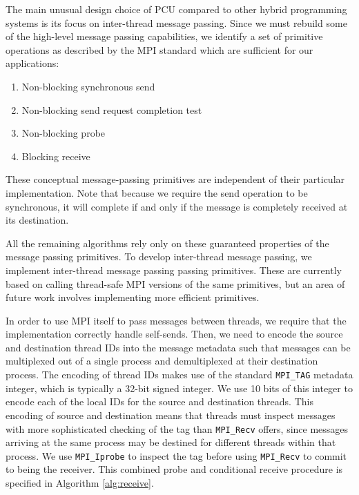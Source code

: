 The main unusual design choice of PCU compared to
other hybrid programming systems is
its focus on inter-thread message passing.
Since we must rebuild some of the high-level message
passing capabilities, we identify a set of primitive
operations as described by the MPI standard \cite{gropp1996mpi}
which are sufficient for our applications:

\begin{enumerate}
\item Non-blocking synchronous send
\item Non-blocking send request completion test
\item Non-blocking probe
\item Blocking receive
\end{enumerate}

These conceptual message-passing primitives are independent
of their particular implementation.
Note that because we require the send operation to be synchronous,
it will complete if and only if the message is completely received at its
destination.

All the remaining algorithms rely only on these guaranteed properties
of the message passing primitives.
To develop inter-thread message passing, we implement inter-thread
message passing passing primitives.
These are currently based on calling thread-safe MPI versions of the
same primitives, but an area of future work involves implementing
more efficient primitives.

In order to use MPI itself to pass messages between threads, we require
that the implementation correctly handle self-sends.
Then, we need to encode the source and destination thread IDs into the message
metadata such that messages can be multiplexed out of a single process
and demultiplexed at their destination process.
The encoding of thread IDs makes use of the standard \texttt{MPI\_TAG} metadata
integer, which is typically a 32-bit signed integer.
We use 10 bits of this integer to encode each of the local IDs for the
source and destination threads.
This encoding of source and destination means that threads must inspect
messages with more sophisticated checking of the tag than
\texttt{MPI\_Recv}
offers, since messages arriving at the same process may be destined
for different threads within that process.
We use \texttt{MPI\_Iprobe} to inspect the tag before using
\texttt{MPI\_Recv} to commit to being the receiver.
This combined probe and conditional receive procedure is specified
in Algorithm \ref{alg:receive}.

